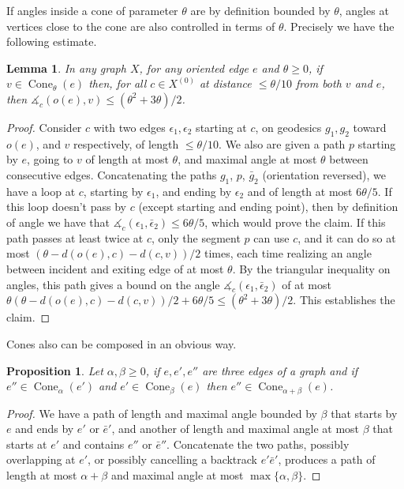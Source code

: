 \documentclass[11pt]{article}
\newtheorem{lemm}[theo]{Lemma}
\newtheorem{prop}[theo]{Proposition}
\theoremstyle{definition}
\numberwithin{equation}{section}
\DeclareMathOperator{\Co}{Cone}
\newcommand{\A}{\measuredangle}
\begin{document}
If angles inside a cone of parameter $\theta$ are by definition bounded by $\theta$, angles at vertices close to the cone are also controlled in terms of $\theta$. Precisely we have the following estimate.

\begin{lemm}\label{lem;thetasquare}
In any graph $X$, for any oriented edge $e$ and $\theta\geq 0$, if $v\in \Co_\theta(e)$ then, for all $c\in X^{(0)}$ at distance $\leq
\theta/10$ from both $v$ and $e$, then $\A_c(o(e), v)\leq (\theta^2+3\theta)/2$.
\end{lemm}

\begin{proof}
Consider $c$ with two edges $\epsilon_1,
\epsilon_2$ starting at $c$, on geodesics $g_1, g_2$ toward $o(e)$, and $v$ respectively, of length $\leq \theta/10$. We also are given a path $p$ starting by $e$, going to $v$ of length at most $\theta$, and maximal angle at most $\theta$ between consecutive edges. Concatenating the paths $g_1$, $p$, $\bar g_2$ (orientation reversed), we have a loop at $c$, starting by $\epsilon_1$, and ending by $\epsilon_2$ and of length at most $6\theta/5$. If this loop doesn't pass by $c$ (except starting and ending point), then by definition of angle we have that $\A_c(
\epsilon_1, \bar \epsilon_2) \leq 6\theta/5$, which would prove the claim. If this path passes at least twice at $c$, only the segment $p$ can use $c$, and it can do so at most $(\theta- d(o(e),c)- d(c,v))/{2}$ times, each time realizing an angle between incident and exiting edge of at most $\theta$. By the triangular inequality on angles, this path gives a bound on the angle $\A_c(\epsilon_1, \bar \epsilon_2)$ of at most $\theta(\theta- d(o(e),c)- d(c,v))/{2}+ 6\theta/5\leq (\theta^2+3\theta)/2$. This establishes the claim.
\end{proof}

Cones also can be composed in an obvious way.

\begin{prop}\label{prop;composition_of_cones}
Let $\alpha,\beta\geq 0$, if $e,e', e''$ are three edges of a graph and if $e''\in
\Co_\alpha(e')$ and $e'\in \Co_\beta(e)$ then $e''\in \Co_{\alpha+\beta}(e)$.
\end{prop}
\begin{proof}
We have a path of length and maximal angle bounded by $\beta$ that starts by $e$ and ends by $e'$ or $\bar e'$, and another of length and maximal angle at most $\beta$ that starts at $e'$ and contains $e''$ or $\bar e''$. Concatenate the two paths, possibly overlapping at $e'$, or possibly cancelling a backtrack $e'\bar e'$, produces a path of length at most $\alpha +\beta$ and maximal angle at most $\max \{\alpha, \beta\}$.
\end{proof}
\end{document}
